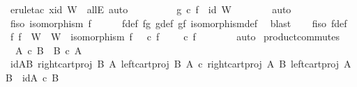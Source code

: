 \begin{isabellebody}
\ {\isacharparenleft}{\kern0pt}erule{\isacharunderscore}{\kern0pt}tac\ x{\isacharequal}{\kern0pt}{\isachardoublequoteopen}id\ W{\isachardoublequoteclose}\ \ allE{\isacharcomma}{\kern0pt}\ auto{\isacharparenright}{\kern0pt}\isanewline
\ \ \ \ \isamarkupfalse%
\ {}\ {}\ \isamarkupfalse%
\ {\isachardoublequoteopen}g\ {\isasymcirc}\isactrlsub c\ f\ {\isacharequal}{\kern0pt}\ id\ W{\isachardoublequoteclose}\isanewline
\ \ \ \ \ \ \isamarkupfalse%
\ auto\isanewline
\ \ \isamarkupfalse%
\isanewline
\isanewline
\ \ \isamarkupfalse%
\ f{\isacharunderscore}{\kern0pt}iso{\isacharcolon}{\kern0pt}\ {\isachardoublequoteopen}isomorphism\ f{\isachardoublequoteclose}\isanewline
\ \ \ \ \isamarkupfalse%
\ f{\isacharunderscore}{\kern0pt}def\ fg\ g{\isacharunderscore}{\kern0pt}def\ gf\ isomorphism{\isacharunderscore}{\kern0pt}def{}\ \isamarkupfalse%
\ blast\isanewline
\ \ \isamarkupfalse%
\ f{\isacharunderscore}{\kern0pt}iso\ f{\isacharunderscore}{\kern0pt}def\ \isamarkupfalse%
\ {\isachardoublequoteopen}{\isasymexists}f{\isachardot}{\kern0pt}\ f\ {\isacharcolon}{\kern0pt}\ W\ {\isasymrightarrow}\ W{\isacharprime}{\kern0pt}\ {\isasymand}\ isomorphism\ f\ {\isasymand}\ {\isasympi}{\isacharprime}{\kern0pt}\ {\isasymcirc}\isactrlsub c\ f\ {\isacharequal}{\kern0pt}\ {\isasympi}\ {\isasymand}\ {\isasympi}{\isacharprime}{\kern0pt}\ {\isasymcirc}\isactrlsub c\ f\ {\isacharequal}{\kern0pt}\ {\isasympi}\isanewline
\ \ \ \ \isamarkupfalse%
\ auto\isanewline
{}\isamarkupfalse%
%
\endisatagproof
{\isafoldproof}%
%
\isadelimproof
\isanewline
%
\endisadelimproof
\isanewline
{}\isamarkupfalse%
\ product{\isacharunderscore}{\kern0pt}commutes{\isacharcolon}{\kern0pt}\isanewline
\ \ {\isachardoublequoteopen}A\ {\isasymtimes}\isactrlsub c\ B\ {\isasymcong}\ B\ {\isasymtimes}\isactrlsub c\ A{\isachardoublequoteclose}\isanewline
%
\isadelimproof
%
\endisadelimproof
%
\isatagproof
{}\isamarkupfalse%
\ {\isacharminus}{\kern0pt}\isanewline
\ \ \isamarkupfalse%
\ id{\isacharunderscore}{\kern0pt}AB{\isacharcolon}{\kern0pt}\ {\isachardoublequoteopen}{\isasymlangle}right{\isacharunderscore}{\kern0pt}cart{\isacharunderscore}{\kern0pt}proj\ B\ A{\isacharcomma}{\kern0pt}\ left{\isacharunderscore}{\kern0pt}cart{\isacharunderscore}{\kern0pt}proj\ B\ A{\isasymrangle}\ {\isasymcirc}\isactrlsub c\ {\isasymlangle}right{\isacharunderscore}{\kern0pt}cart{\isacharunderscore}{\kern0pt}proj\ A\ B{\isacharcomma}{\kern0pt}\ left{\isacharunderscore}{\kern0pt}cart{\isacharunderscore}{\kern0pt}proj\ A\ B{\isasymrangle}\ {\isacharequal}{\kern0pt}\ id{\isacharparenleft}{\kern0pt}A\ {\isasymtimes}\isactrlsub c\ B{\isacharparenright}{\kern0pt}{\isachardoublequoteclose}\isanewline

\end{isabellebody}
